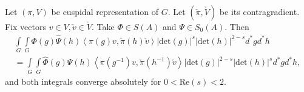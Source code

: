 \begin{proposition}
Let $(\pi,V)$ be cuspidal representation of $G$. Let $(\check \pi,\check V)$ be its contragradient. Fix vectors $v\in V,\check v\in \check V$. Take $\Phi \in S(A)$ and $\Psi\in S_0(A)$. Then
\begin{equation}\label{1}
\begin{split}
\int\limits_G \int\limits_G \Phi(g) \widehat {\Psi}(h) \left \langle \pi (g)v , \check \pi (h) \check v\right \rangle \left | \mathrm {det} (g)\right |^{s}\left | \mathrm {det} (h)\right |^{2 -s }d^*g d^*h\\
=\int\limits_G \int\limits_G\widehat \Phi(g)  {\Psi}(h) \left \langle \pi (g^{-1})v , \check \pi (h^{-1}) \check v\right \rangle \left | \mathrm {det} (g)\right |^{2 -s}\left | \mathrm {det} (h)\right |^{s}d^*g d^*h,
\end{split}
\end{equation}
and both integrals converge absolutely for $0 < \mathrm { Re} (s) < 2$.
\end{proposition}

